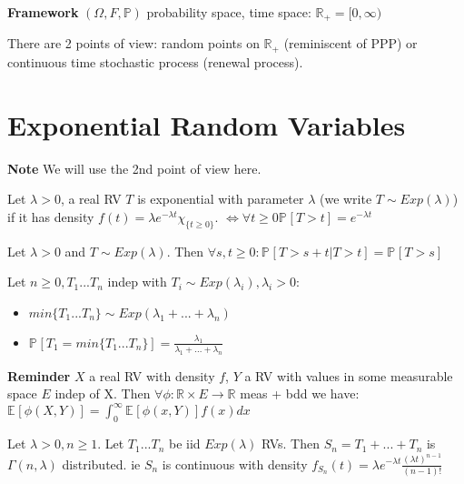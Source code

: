 \textbf{Framework} $(\Omega, F, \mathbb{P})$ probability space, time space: $\mathbb{R}_{+}=[0,\infty)$ 

There are 2 points of view: random points on $\mathbb{R}_{+}$ (reminiscent of PPP) or continuous time stochastic process (renewal process).

\section{Exponential Random Variables}
\textbf{Note} We will use the 2nd point of view here.

\begin{defn}
	Let $\lambda> 0$, a real RV $T$ is exponential with parameter $\lambda$ (we write $T \sim Exp(\lambda)$) if it has density $f(t) = \lambda e ^{-\lambda t}\chi_{\{t\geq 0\}}$. $\iff \forall t\geq 0 \mathbb{P}_{} \left[ T>t \right] = e^{-\lambda t}$
\end{defn}

\begin{prop}
	Let $\lambda > 0$ and $T \sim Exp(\lambda)$. Then  $\forall s,t\geq 0: \mathbb{P}_{} \left[ T>s+t | T>t \right] = \mathbb{P}_{} \left[ T>s \right] $
\end{prop}
\begin{prop}
	Let $n\geq 0, T_1...T_n$ indep with $T_i \sim Exp(\lambda_i), \lambda_i > 0$: 
\begin{itemize}
	\item  $min\{T_1...T_n\} \sim Exp(\lambda_1+...+\lambda_n)$
	\item $\mathbb{P}_{} \left[ T_1 = min\{T_1...T_n\} \right] = \frac{\lambda_1}{\lambda_1+...+\lambda_n}$
\end{itemize}

\end{prop}
 
\textbf{Reminder} $X$ a real RV with density $f$, $Y$ a RV with values in some measurable space $E$ indep of X. Then $\forall \phi:\mathbb{R} \times E \to \mathbb{R}$ meas + bdd we have: $\mathbb{E}_{} \left[ \phi(X,Y) \right] = \int_{0}^{\infty} \mathbb{E}_{} \left[ \phi(x,Y) \right] f(x) dx$ 

\begin{prop}
	Let $\lambda > 0, n\geq 1$. Let $T_1...T_n$ be iid $Exp(\lambda)$ RVs. Then  $S_n = T_1+...+T_n$ is  $\Gamma(n, \lambda)$ distributed. ie $S_n$ is continuous with density $f_{S_n}(t)=\lambda e^{-\lambda t} \frac{(\lambda t)^{n-1}}{(n-1)!}$
\end{prop}

